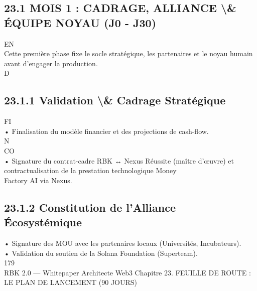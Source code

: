 \documentclass[12pt,landscape,a4paper]{article}
\begin{document}
\subsection{23.1 MOIS 1 : CADRAGE, ALLIANCE \textbackslash{}& ÉQUIPE NOYAU (J0 - J30)}
\vspace{0.5em}
\vspace{0.5em}
\vspace{0.5em}
\vspace{0.5em}
EN\\
Cette première phase fixe le socle stratégique, les partenaires et le noyau humain avant d’engager la production.\\
\vspace{0.5em}
\vspace{0.5em}
\vspace{0.5em}
\vspace{0.5em}
D\\
\subsection{23.1.1 Validation \textbackslash{}& Cadrage Stratégique}
\vspace{0.5em}
\vspace{0.5em}
\vspace{0.5em}
\vspace{0.5em}
FI\\
• Finalisation du modèle financier et des projections de cash-flow.\\
N\\
CO\\
• Signature du contrat-cadre RBK ↔ Nexus Réussite (maître d’œuvre) et contractualisation de la prestation technologique Money\\
Factory AI via Nexus.\\
\vspace{0.5em}
\vspace{0.5em}
\subsection{23.1.2 Constitution de l’Alliance Écosystémique}
• Signature des MOU avec les partenaires locaux (Universités, Incubateurs).\\
\vspace{0.5em}
• Validation du soutien de la Solana Foundation (Superteam).\\
\vspace{0.5em}
\vspace{0.5em}
\vspace{0.5em}
\vspace{0.5em}
179\\
RBK 2.0 — Whitepaper Architecte Web3                                   Chapitre 23. FEUILLE DE ROUTE : LE PLAN DE LANCEMENT (90 JOURS)\\
\vspace{0.5em}
\vspace{0.5em}
\end{document}
